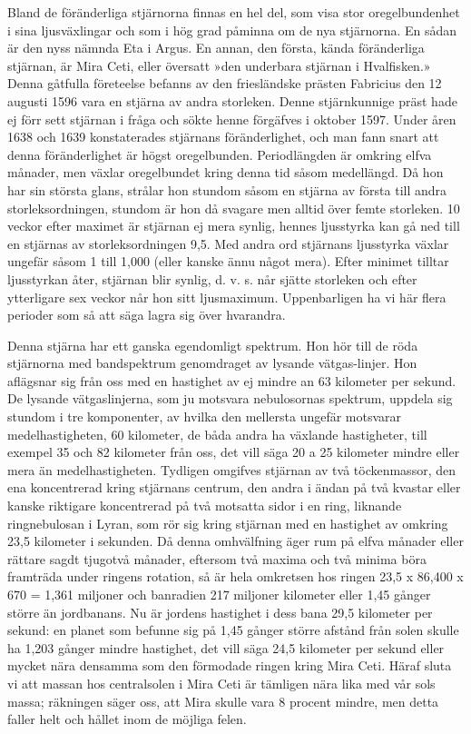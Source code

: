 \documentclass[a4paper, 12pt, oneside, swedish]{article}
\begin{document}
Bland de föränderliga stjärnorna finnas en hel del, som visa stor oregelbundenhet i sina ljusväxlingar och som i hög grad påminna om de nya stjärnorna. En sådan är den nyss nämnda Eta i Argus. En annan, den första, kända föränderliga stjärnan, är Mira Ceti, eller översatt »den underbara stjärnan i Hvalfisken.» Denna gåtfulla företeelse befanns av den friesländske prästen Fabricius den 12 augusti 1596 vara en stjärna av andra storleken. Denne stjärnkunnige präst hade ej förr sett stjärnan i fråga och sökte henne förgäfves i oktober 1597. Under åren 1638 och 1639 konstaterades stjärnans föränderlighet, och man fann snart att denna föränderlighet är högst oregelbunden. Periodlängden är omkring elfva månader, men växlar oregelbundet kring denna tid såsom medellängd. Då hon har sin största glans, strålar hon stundom såsom en stjärna av första till andra storleksordningen, stundom är hon då svagare men alltid över femte storleken. 10 veckor efter maximet är stjärnan ej mera synlig, hennes ljusstyrka kan gå ned till en stjärnas av storleksordningen 9,5. Med andra ord stjärnans ljusstyrka växlar ungefär såsom 1 till 1,000 (eller kanske ännu något mera). Efter minimet tilltar ljusstyrkan åter, stjärnan blir synlig, d. v. s. når sjätte storleken och efter ytterligare sex veckor når hon sitt ljusmaximum. Uppenbarligen ha vi här flera perioder som så att säga lagra sig över hvarandra.

Denna stjärna har ett ganska egendomligt spektrum. Hon hör till de röda stjärnorna med bandspektrum genomdraget av lysande vätgas-linjer. Hon aflägsnar sig från oss med en hastighet av ej mindre an 63 kilometer per sekund. De lysande vätgaslinjerna, som ju motsvara nebulosornas spektrum, uppdela sig stundom i tre komponenter, av hvilka den mellersta ungefär motsvarar medelhastigheten, 60 kilometer, de båda andra ha växlande hastigheter, till exempel 35 och 82 kilometer från oss, det vill säga 20 a 25 kilometer mindre eller mera än medelhastigheten. Tydligen omgifves stjärnan av två töckenmassor, den ena koncentrerad kring stjärnans centrum, den andra i ändan på två kvastar eller kanske riktigare koncentrerad på två motsatta sidor i en ring, liknande ringnebulosan i Lyran, som rör sig kring stjärnan med en hastighet av omkring 23,5 kilometer i sekunden. Då denna omhvälfning äger rum på elfva månader eller rättare sagdt tjugotvå månader, eftersom två maxima och två minima böra framträda under ringens rotation, så är hela omkretsen hos ringen 23,5 x 86,400 x 670 = 1,361 miljoner och banradien 217 miljoner kilometer eller 1,45 gånger större än jordbanans. Nu är jordens hastighet i dess bana 29,5 kilometer per sekund: en planet som befunne sig på 1,45 gånger större afstånd från solen skulle ha 1,203 gånger mindre hastighet, det vill säga 24,5 kilometer per sekund eller mycket nära densamma som den förmodade ringen kring Mira Ceti. Häraf sluta vi att massan hos centralsolen i Mira Ceti är tämligen nära lika med vår sols massa; räkningen säger oss, att Mira skulle vara 8 procent mindre, men detta faller helt och hållet inom de möjliga felen.
\end{document}
